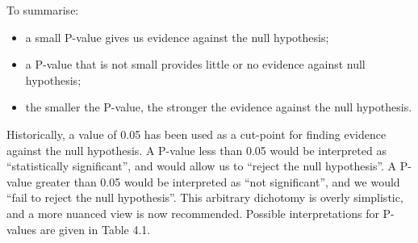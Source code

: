 \documentclass[
]{memoir}
\providecommand{\tightlist}{%
  \setlength{\itemsep}{0pt}\setlength{\parskip}{0pt}}
\begin{document}
To summarise:

\begin{itemize}
\tightlist
\item
  a small P-value gives us evidence against the null hypothesis;
\item
  a P-value that is not small provides little or no evidence against null hypothesis;
\item
  the smaller the P-value, the stronger the evidence against the null hypothesis.
\end{itemize}

Historically, a value of 0.05 has been used as a cut-point for finding evidence against the null hypothesis. A P-value less than 0.05 would be interpreted as ``statistically significant'', and would allow us to ``reject the null hypothesis''. A P-value greater than 0.05 would be interpreted as ``not significant'', and we would ``fail to reject the null hypothesis''. This arbitrary dichotomy is overly simplistic, and a more nuanced view is now recommended. Possible interpretations for P-values are given in Table 4.1.

 
  \providecommand{\huxb}[2]{\arrayrulecolor[RGB]{#1}\global\arrayrulewidth=#2pt}
  \providecommand{\huxvb}[2]{\color[RGB]{#1}\vrule width #2pt}
  \providecommand{\huxtpad}[1]{\rule{0pt}{#1}}
  \providecommand{\huxbpad}[1]{\rule[-#1]{0pt}{#1}}
\end{document}
